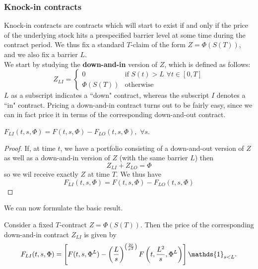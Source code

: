 \subsubsection{Knock-in contracts}
Knock-in contracts are contracts which will start to exist if and only if the price of the underlying stock hits a prespecified barrier level at some time during the contract period. We thus fix a standard $T$-claim of the form $Z = \Phi(S(T))$, and we also fix a barrier $L$. \\
We start by studying the \textbf{down-and-in} version of $Z$, which is defined as follows:
\begin{equation}
    Z_{LI} =
    \begin{cases}
        0 & \text{if } S(t)>L\,\,\forall t\in[0,T] \\
        \Phi(S(T)) & \text{otherwise}
    \end{cases}
\end{equation}
$L$ as a subscript indicates a ``down" contract, whereas the subscript $I$ denotes a ``in" contract. Pricing a down-and-in contract turns out to be fairly easy, since we can in fact price it in terms of the corresponding down-and-out contract.
\begin{lemma}
    $F_{LI}(t, s, \Phi) = F(t, s, \Phi) - F_{LO}(t, s, \Phi),\,\, \forall s$.
\end{lemma}
\begin{proof}
    If, at time $t$, we have a portfolio consisting of a down-and-out version of $Z$ as well as a down-and-in version of $Z$ (with the same barrier $L$) then
    \begin{equation*}
        Z_{LI} + Z_{LO} = \Phi
    \end{equation*}
    so we wil receive exactly $Z$ at time $T$. We thus have
    \begin{equation*}
        F_{LI} (t, s, \Phi) = F(t, s, \Phi) - F_{LO}(t, s, \Phi)
    \end{equation*}
\end{proof}
We can now formulate the basic result.
\begin{proposition}
    Consider a fixed $T$-contract $Z = \Phi(S(T))$. Then the price of the corresponding down-and-in contract $Z_{LI}$ is given by
    \begin{equation}
        F_{LI}(t,s,\Phi) = \left[F(t,s,\Phi^L)-\left(\frac{L}{s}\right)^{\left(\frac{2\Tilde{r}}{\sigma^2}\right)} F\left(t,\frac{L^2}{s},\Phi^L\right)\right]\mathds{1}_{s<L}.
    \end{equation}
\end{proposition}
